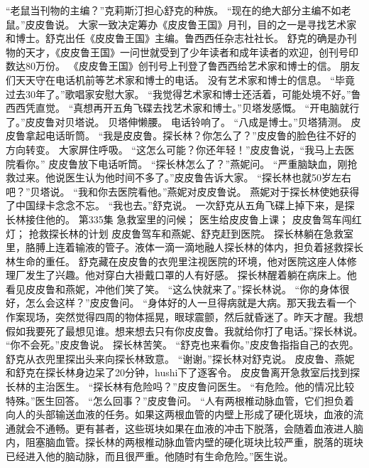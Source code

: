 \documentclass[a4paper,12pt,UTF8,twoside]{ctexbook}
\begin{document}
        “老鼠当刊物的主编？”克莉斯汀担心舒克的种族。  
        “现在的绝大部分主编不如老鼠。”皮皮鲁说。  
        大家一致决定筹办《皮皮鲁王国》月刊，目的之一是寻找艺术家和博士。舒克出任《皮皮鲁王国》主编。鲁西西任杂志社社长。  
        舒克的确是办刊物的天才，《皮皮鲁王国》一问世就受到了少年读者和成年读者的欢迎，创刊号印数达80万份。  
        《皮皮鲁王国》创刊号上刊登了鲁西西给艺术家和博士的信。        
        朋友们天天守在电话机前等艺术家和博士的电话。  
        没有艺术家和博士的信息。  
        “毕竟过去30年了。”歌唱家安慰大家。  
        “我觉得艺术家和博士还活着，可能处境不好。”鲁西西凭直觉。  
        “真想再开五角飞碟去找艺术家和博士。”贝塔发感慨。  
        “开电脑就行了。”皮皮鲁对贝塔说。  
        贝塔伸懒腰。  
        电话铃响了。  
        “八成是博士。”贝塔猜测。  
        皮皮鲁拿起电话昕筒。  
        “我是皮皮鲁。探长林？你怎么了？”皮皮鲁的脸色往不好的方向转变。  
        大家屏住呼吸。  
        “这怎么可能？你还年轻！”皮皮鲁说，“我马上去医院看你。”  
        皮皮鲁放下电话听筒。  
        “探长林怎么了？”燕妮问。  
        “严重脑缺血，刚抢救过来。他说医生认为他时间不多了。”皮皮鲁告诉大家。  
        “探长林也就50岁左右吧？”贝塔说。  
        “我和你去医院看他。”燕妮对皮皮鲁说。        
        燕妮对于探长林使她获得了中国绿卡念念不忘。  
        “我也去。”舒克说。  
        一次舒克从五角飞碟上掉下来，是探长林接住他的。          第335集  
        急救室里的问候；  
        医生给皮皮鲁上课；  
        皮皮鲁驾车闯红灯；  
        抢救探长林的计划    
        皮皮鲁驾车和燕妮、舒克赶到医院。  
        探长林躺在急救室里，胳膊上连着输液的管子。液体一滴一滴地融人探长林的体内，担负着拯救探长林生命的重任。  
        舒克藏在皮皮鲁的衣兜里注视医院的环境，他对医院这座人体修理厂发生了兴趣。他对穿白大褂戴口罩的人有好感。  
        探长林醒着躺在病床上。他看见皮皮鲁和燕妮，冲他们笑了笑。  
        “这么快就来了。”探长林说。  
        “你的身体很好，怎么会这样？”皮皮鲁问。        
        “身体好的人一旦得病就是大病。那天我去看一个作案现场，突然觉得四周的物体摇晃，眼球震颤，然后就昏迷了。昨天才醒。我想假如我要死了最想见谁。想来想去只有你皮皮鲁。我就给你打了电话。”探长林说。  
        “你不会死。”皮皮鲁说。  
        探长林苦笑。  
        “舒克也来看你。”皮皮鲁指指自己的衣兜。  
        舒克从衣兜里探出头来向探长林致意。  
        “谢谢。”探长林对舒克说。  
        皮皮鲁、燕妮和舒克在探长林身边呆了20分钟，hushi下了逐客令。  
        皮皮鲁离开急救室后找到探长林的主治医生。  
        “探长林有危险吗？”皮皮鲁问医生。  
        “有危险。他的情况比较特殊。”医生回答。  
        “怎么回事？”皮皮鲁问。  
        “人有两根椎动脉血管，它们担负着向人的头部输送血液的任务。如果这两根血管的内壁上形成了硬化斑块，血液的流通就会不通畅。更有甚者，这些斑块如果在血液的冲击下脱落，会随着血液进人脑内，阻塞脑血管。探长林的两根椎动脉血管内壁的硬化斑块比较严重，脱落的斑块已经进入他的脑动脉，而且很严重。他随时有生命危险。”医生说。  
\end{document}
